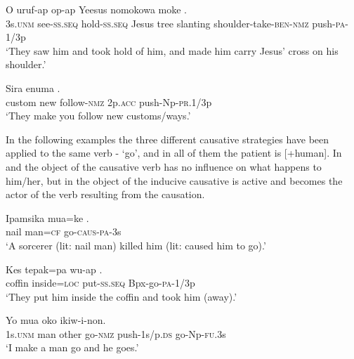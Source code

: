 \ea%
\label{ex:3:x1003}
\gll O uruf-ap op-ap Yeesus nomokowa moke  .\\
3s.\textsc{unm} see-\textsc{ss}.\textsc{seq} hold-\textsc{ss}.\textsc{seq} Jesus tree slanting shoulder-take-\textsc{ben}-\textsc{nmz} push-\textsc{pa}-1/3p\\
\glt`They saw him and took hold of him, and made him carry Jesus' cross on his shoulder.'
\z

\ea%
\label{ex:3:x1002}
\gll Sira enuma   . \\
custom new follow-\textsc{nmz} 2p.\textsc{acc} push-Np-\textsc{pr}.1/3p\\
\glt`They make you follow new customs/ways.'
\z

In the following examples the three different causative strategies have been applied to the same verb - `go', and in all of them the patient is [+human]. In  and  the object of the causative verb has no influence on what happens to him/her, but in  the object of the inducive causative is active and becomes the actor of the verb resulting from the causation. 

\ea%
\label{ex:3:x1016}
\gll Ipamsika mua=ke . \\
nail man=\textsc{cf} go-\textsc{caus}-\textsc{pa}-3s \\
\glt`A sorcerer (lit: nail man) killed him (lit: caused him to go).'
\z

\ea%
\label{ex:3:x1829}
\gll Kes tepak=pa wu-ap . \\
coffin inside=\textsc{loc} put-\textsc{ss}.\textsc{seq} Bpx-go-\textsc{pa}-1/3p\\
\glt`They put him inside the coffin and took him (away).'
\z

\ea%
\label{ex:3:x1873}
\gll Yo mua oko   ikiw-i-non. \\
1s.\textsc{unm} man other go-\textsc{nmz} push-1s/p.\textsc{ds} go-Np-\textsc{fu}.3s\\
\glt`I make a man go and he goes.'
\z

